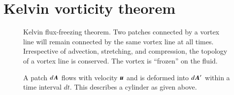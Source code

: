 \section{Kelvin vorticity theorem} 


\begin{figure}
  \begin{center}
  \end{center}
  \caption[]{Kelvin flux-freezing theorem. Two patches connected by a
    vortex line will remain connected by the same vortex line at
  all times. Irrespective of advection, stretching, and compression,
  the topology of a vortex line is conserved. The vortex is ``frozen''
  on the fluid.}
  \label{fig:KelvinFluxFreezing}
\end{figure}


\begin{figure}
  \begin{center}
  \end{center}
  \caption[]{A patch $d{\boldsymbol{A}}$ flows with velocity ${\boldsymbol{u}}$ and is deformed into $d{\boldsymbol{A}}^\prime$ within
    a time interval $dt$. This describes a cylinder as given above.}
  \label{fig:KelvinTheorem_Cylinder}
\end{figure}

